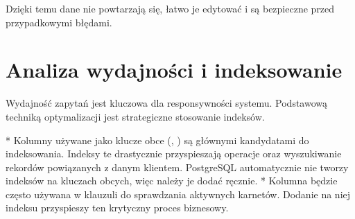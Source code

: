 \documentclass[letterpaper,10pt,polish]{sphinxmanual}
\begin{document}
\sphinxAtStartPar
Dzięki temu dane nie powtarzają się, łatwo je edytować i są bezpieczne przed przypadkowymi błędami.


\section{Analiza wydajności i indeksowanie}
\label{\detokenize{rozdzial4/rozdzial4:analiza-wydajnosci-i-indeksowanie}}
\sphinxAtStartPar
Wydajność zapytań jest kluczowa dla responsywności systemu. Podstawową techniką optymalizacji jest strategiczne stosowanie indeksów.

\sphinxAtStartPar
{}
*  Kolumny używane jako klucze obce (, ) są głównymi kandydatami do indeksowania. Indeksy te drastycznie przyspieszają operacje  oraz wyszukiwanie rekordów powiązanych z danym klientem. PostgreSQL automatycznie nie tworzy indeksów na kluczach obcych, więc należy je dodać ręcznie.
*  Kolumna  będzie często używana w klauzuli  do sprawdzania aktywnych karnetów. Dodanie na niej indeksu przyspieszy ten krytyczny proces biznesowy.

\sphinxAtStartPar
{}

\begin{sphinxVerbatim}[commandchars=\\\{\}]


\end{sphinxVerbatim}
\end{document}
